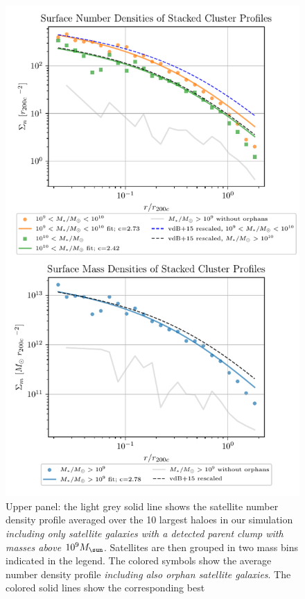 \begin{figure}
  \centering
  \includegraphics[width=\linewidth, keepaspectratio]{images/radial-profiles.pdf}%
  \caption{Upper panel: the light grey  solid line shows the satellite
    number density profile averaged over  the 10 largest haloes in our
    simulation {\it including only  satellite galaxies with a detected
    parent clump with masses above $10^9 \msol$}.   Satellites are  
    then grouped  in two  mass bins
    indicated in  the legend.   The colored  symbols show  the average
    number  density  profile  {\it  including  also  orphan  satellite
      galaxies}.  The colored solid  lines show the corresponding best
}
\end{figure}
